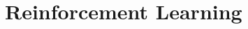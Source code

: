 \documentclass[main]{subfiles}
\begin{document}
\newpage
\section{Reinforcement Learning}
\end{document}
